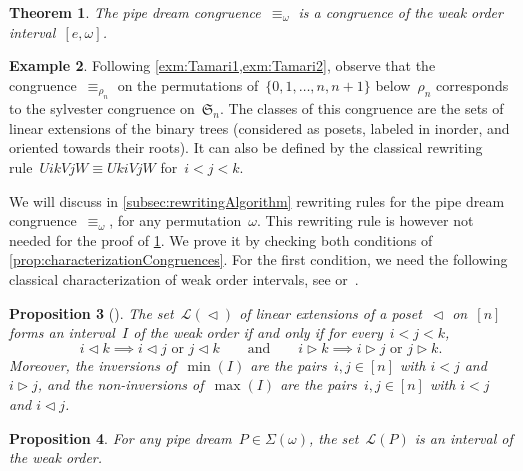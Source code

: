 \documentclass{amsart}
\newtheorem{theorem}{Theorem}[section]
\newtheorem{proposition}[theorem]{Proposition}
\theoremstyle{definition}
\newtheorem{example}[theorem]{Example}
\newcommand{\fS}{\mathfrak{S}} %
\newcommand{\acyclicPipeDreams}{\Sigma} %
\newcommand{\linearExtensions}{\mathcal{L}} %
\newcommand{\less}{\vartriangleleft} %
\newcommand{\more}{\vartriangleright} %
\begin{document}
\begin{theorem}
\label{thm:pipeDreamCongruence}
The pipe dream congruence~$\equiv_\omega$ is a congruence of the weak order interval~$[e,\omega]$.
\end{theorem}

\begin{example}
\label{exm:Tamari3}
Following \cref{exm:Tamari1,exm:Tamari2}, observe that the congruence~$\equiv_{\rho_n}$ on the permutations of~$\{0, 1, \dots, n, n+1\}$ below~$\rho_n$ corresponds to the sylvester congruence on~$\fS_n$.
The classes of this congruence are the sets of linear extensions of the binary trees (considered as posets, labeled in inorder, and oriented towards their roots).
It can also be defined by the classical rewriting rule~$UikVjW \equiv UkiVjW$ for~$i < j < k$.
\end{example}

We will discuss in \cref{subsec:rewritingAlgorithm} rewriting rules for the pipe dream congruence~$\equiv_\omega$, for any permutation~$\omega$.
This rewriting rule is however not needed for the proof of \cref{thm:pipeDreamCongruence}.
We prove it by checking both conditions of \cref{prop:characterizationCongruences}.
For the first condition, we need the following classical characterization of weak order intervals, see \cite{BjornerWachs} or~\cite{ChatelPilaudPons}.

\begin{proposition}[{\cite[Thm.~6.8]{BjornerWachs}}]
\label{prop:WOIP}
The set~$\linearExtensions(\less)$ of linear extensions of a poset~$\less$ on~$[n]$ forms an interval~$I$ of the weak order if and only if for every~$i < j < k$,
\[
i \less k \implies i \less j \text{ or } j \less k
\qquad\text{and}\qquad
i \more k \implies i \more j \text{ or } j \more k.
\]
Moreover, the inversions of~$\min(I)$ are the pairs~$i,j \in [n]$ with $i < j$ and $i \more j$, and the non-inversions of~$\max(I)$ are the pairs~$i,j \in [n]$ with $i < j$ and $i \less j$.
\end{proposition}

\begin{proposition}
\label{prop:intervals}
For any pipe dream~$P \in \acyclicPipeDreams(\omega)$, the set~$\linearExtensions(P)$ is an interval of the weak order.
\end{proposition}
\end{document}
